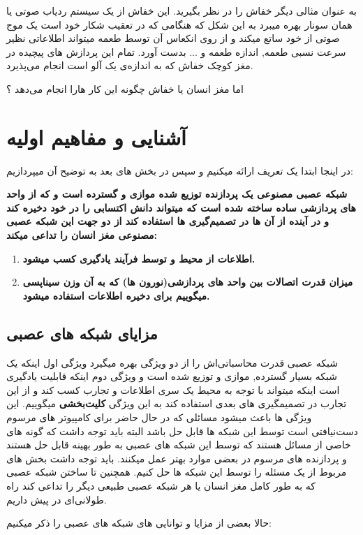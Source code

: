 \documentclass[11pt,a4paper,twocolumn]{article}
\begin{document}
به عنوان مثالی دیگر خفاش را در نظر بگیرید. این خفاش از یک سیستم ردیاب صوتی یا همان سونار بهره میبرد به این شکل که هنگامی که در تعقیب شکار خود است یک موج صوتی از خود ساتع میکند و از روی انکعاس آن توسط طعمه میتواند اطلاعاتی نظیر  سرعت نسبی طعمه, اندازه طعمه و ... بدست آورد. تمام این پردازش های پیچیده در مغز کوچک خفاش که به اندازه‌‌ی یک آلو است انجام می‌پذیرد.

اما مغز انسان یا خفاش چگونه این کار هارا انجام می‌دهد ؟ 
\section{آشنایی و مفاهیم اولیه}
در اینجا ابتدا یک تعریف ارائه میکنیم\cite{haykin}
و سپس در بخش های بعد به توضیح آن میپردازیم:

\textbf{ شبکه عصبی مصنوعی یک پردازنده توزیع شده موازی و گسترده است و که از واحد های پردازشی ساده ساخته شده است که میتواند دانش اکتسابی را در خود دخیره کند و در آینده از آن ها در تصمیم‌گیری ها استفاده کند  از دو جهت این شبکه عصبی مصنوعی  مغز انسان  را تداعی میکند:
}
\begin{enumerate}
\item 
\textbf{اطلاعات از محیط و توسط فرآیند یادگیری کسب میشود.}
 
\item
\textbf{میزان قدرت اتصالات بین واحد های پردازشی(نورون ها) که به آن وزن سیناپسی میگوییم برای دخیره اطلاعات استفاده میشود.}
\end{enumerate}

\subsection{مزایای شبکه های عصبی}
شبکه عصبی قدرت محاسباتی‌اش را از دو ویژگی بهره میگیرد ویژگی اول اینکه یک شبکه بسیار گسترده, موازی و توزیع شده است و ویژگی دوم اینکه قابلیت یادگیری است اینکه میتواند با توجه به محیط یک سری اطلاعات و تجارب کسب کند و از این تجارب در تصمیمگیری های بعدی استفاده کند به این ویژگی
\textbf{کلیت‌بخشی}
میگوییم. این ویژگی ها باعث میشود  مسائلی که در حال حاضر برای کامپیوتر های مرسوم دست‌نیافتی است توسط این شبکه ها قابل حل باشد البته باید توجه داشت که گونه های خاصی از مسائل هستند که توسط این شبکه های عصبی به طور بهینه قابل حل هستند و پردازنده  های مرسوم در بعضی موارد بهتر عمل میکنند. باید توجه داشت بخش های مربوط از یک مسئله را توسط این شبکه ها حل کنیم. همچنین تا ساختن شبکه عصبی که به طور کامل مغز انسان یا هر شبکه عصبی طبیعی دیگر را تداعی کند راه طولانی‌ای در پیش داریم.

حالا بعضی از مزایا و توانایی های شبکه های عصبی را ذکر میکنیم:
\end{document}
